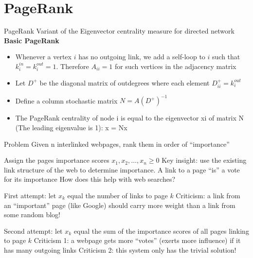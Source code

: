 \documentclass[aspectratio=169]{beamer}\usepackage[]{graphicx}\usepackage[]{xcolor}
\begin{document}
\section{PageRank}

\begin{frame}{PageRank}
Variant of the Eigenvector centrality measure for directed network
\vfill
\textbf{Basic PageRank}
\begin{itemize}
\item Whenever a vertex $i$ has no outgoing link, we add a self-loop to $i$ such that $k^{in}_i=k^{out}_i=1$. Therefore $A_{ii}=1$ for such vertices in the adjacency matrix
\item Let $D^+$ be the diagonal matrix of outdegrees where each element $D_{ii}^+ = k_i^{out}$
\item Define a column stochastic matrix $N = A(D^+)^{-1}$
\item
The PageRank centrality of node i is equal to the 
eigenvector xi of matrix N (The leading eigenvalue is 1):
x = Nx
\end{itemize}
\end{frame}


\begin{frame}
	\begin{block}{Problem}
		Given n interlinked webpages, rank them in order of ``importance''
	\end{block}
	\vfill
Assign the pages importance scores $x_1, x_2,\ldots, x_n\geq 0$
\vfill
Key insight: use the existing link structure of the web to determine importance. A link to a page ``is'' a vote for its importance
\vfill
How does this help with web searches?
\end{frame}


\begin{frame}{}
	First attempt: let $x_k$ equal the number of links to page $k$
\vfill
	Criticism: a link from an ``important'' page (like Google) should carry more weight than a link from some random blog!
\end{frame}

\begin{frame}{}
	Second attempt: let $x_k$ equal the sum of the importance scores of all pages linking to page $k$
	\vfill
	Criticism 1: a webpage gets more ``votes'' (exerts more influence) if it has many outgoing links
	\vfill
	Criticism 2: this system only has the trivial solution!	
\end{frame}
\end{document}
